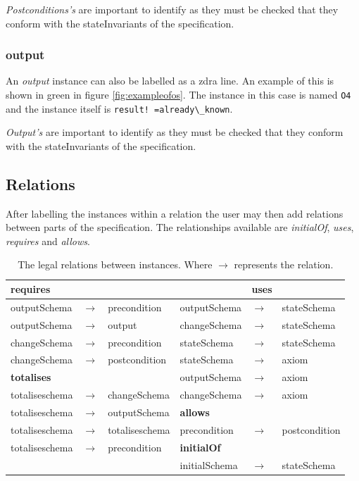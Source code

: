 \emph{Postconditions's} are important to identify as they must be checked that they
conform with the stateInvariants of the specification.

\subsubsection{output}

An \emph{output} instance can also be labelled as a \gls{zdra} line. An example
of this is shown in green in figure \ref{fig:exampleofos}. The instance in this
case is named
 \verb|O4| and the instance itself is \verb|result! =already\_known|.

 \emph{Output's} are important to identify as they must be checked that they
conform with the stateInvariants of the specification.
\subsection{Relations}
\label{subsec:zdrarelations}

After labelling the instances within a relation the user may then add relations
between parts of the specification. The relationships available are
\emph{initialOf}, \emph{uses}, \emph{requires} and \emph{allows}.

\begin{table}[H]
\begin{tabular}{|lll||lll|}
\hline
\textbf{requires} & & &  & \textbf{uses} & \\
\hline
outputSchema & $\longrightarrow$ & precondition  & outputSchema &
$\longrightarrow$ & stateSchema\\
outputSchema & $\longrightarrow$ & output & changeSchema & $\longrightarrow$ &
stateSchema \\
changeSchema & $\longrightarrow$ & precondition  & stateSchema &
$\longrightarrow$ & stateSchema \\
changeSchema & $\longrightarrow$ & postcondition  & stateSchema &
$\longrightarrow$ & axiom \\
\cline{1-3}
\textbf{totalises} & &  & outputSchema & $\longrightarrow$ & axiom \\
\cline{1-3}
totaliseschema & $\longrightarrow$ & changeSchema  & changeSchema & $\longrightarrow$
& axiom \\
\cline{4-6}
totaliseschema & $\longrightarrow$ & outputSchema & \textbf{allows}  & & \\
\cline{4-6}
totaliseschema & $\longrightarrow$ & totaliseschema  & precondition  & $\longrightarrow$  &
postcondition \\
\cline{4-6}
totaliseschema & $\longrightarrow$ & precondition & \textbf{initialOf} &  &  \\ 
\cline{4-6}
& &  & initialSchema & $\longrightarrow$ & stateSchema \\ 
\hline
\end{tabular}
\caption{\label{tab:relationsallowed} The legal relations between instances. Where $\longrightarrow$ represents the relation.}
\end{table}

